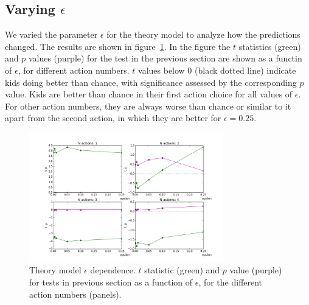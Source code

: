 \documentclass[11pt, a4paper]{article}
\begin{document}
\subsection*{Varying $\epsilon$}
We varied the parameter $\epsilon$ for the theory model to analyze how the predictions changed. The results are shown in figure~\ref{fig:varye}. In the figure the $t$ statistics (green) and $p$ values (purple) for the test in the previous section are shown as a functin of $\epsilon$, for different action numbers. $t$ values below 0 (black dotted line) indicate kids doing better than chance, with significance assessed by the corresponding $p$ value. Kids are better than chance in their first action choice for all values of $\epsilon$. For other action numbers, they are always worse than chance or similar to it apart from the second action, in which they are better for $\epsilon=0.25$. 
\begin{figure}[h!]
\begin{center}
\includegraphics[width=0.75\textwidth]{../Plots/vary_ep_theory.png}
\end{center}
\caption{Theory model $\epsilon$ dependence. $t$ statistic (green) and $p$ value (purple) for tests in previous section as a function of $\epsilon$, for the different action numbers (panels).}
\label{fig:varye}
\end{figure}
\end{document}
